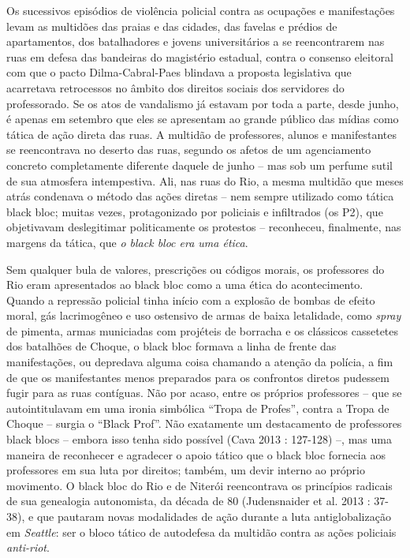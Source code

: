Os sucessivos episódios de violência policial contra as ocupações e
manifestações levam as multidões das praias e das cidades, das favelas e
prédios de apartamentos, dos batalhadores e jovens universitários a se
reencontrarem nas ruas em defesa das bandeiras do magistério estadual,
contra o consenso eleitoral com que o pacto Dilma-Cabral-Paes blindava a
proposta legislativa que acarretava retrocessos no âmbito dos direitos
sociais dos servidores do professorado. Se os atos de vandalismo já
estavam por toda a parte, desde junho, é apenas em setembro que eles se
apresentam ao grande público das mídias como tática de ação direta das
ruas. A multidão de professores, alunos e manifestantes se reencontrava
no deserto das ruas, segundo os afetos de um agenciamento concreto
completamente diferente daquele de junho -- mas sob um perfume sutil de
sua atmosfera intempestiva. Ali, nas ruas do Rio, a mesma multidão que
meses atrás condenava o método das ações diretas -- nem sempre utilizado
como tática black bloc; muitas vezes, protagonizado por policiais e
infiltrados (os P2), que objetivavam deslegitimar politicamente os
protestos -- reconheceu, finalmente, nas margens da tática, que \emph{o
black bloc era uma ética}.

Sem qualquer bula de valores, prescrições ou códigos morais, os
professores do Rio eram apresentados ao black bloc como a uma ética do
acontecimento. Quando a repressão policial tinha início com a explosão
de bombas de efeito moral, gás lacrimogêneo e uso ostensivo de armas de
baixa letalidade, como \emph{spray }de pimenta, armas municiadas com
projéteis de borracha e os clássicos cassetetes dos batalhões de Choque,
o black bloc formava a linha de frente das manifestações, ou depredava
alguma coisa chamando a atenção da polícia, a fim de que os
manifestantes menos preparados para os confrontos diretos pudessem fugir
para as ruas contíguas. Não por acaso, entre os próprios professores --
que se autointitulavam em uma ironia simbólica ``Tropa de Profes'',
contra a Tropa de Choque -- surgia o ``Black Prof''. Não exatamente um
destacamento de professores black blocs -- embora isso tenha sido
possível (Cava 2013 : 127-128) --, mas uma maneira de reconhecer e
agradecer o apoio tático que o black bloc fornecia aos professores em
sua luta por direitos; também, um devir interno ao próprio movimento. O
black bloc do Rio e de Niterói reencontrava os princípios radicais de
sua genealogia autonomista, da década de 80 (Judensnaider et al. 2013 :
37-38), e que pautaram novas modalidades de ação durante a luta
antiglobalização em \emph{Seattle}: ser o bloco tático de autodefesa da
multidão contra as ações policiais \emph{anti-riot}.

